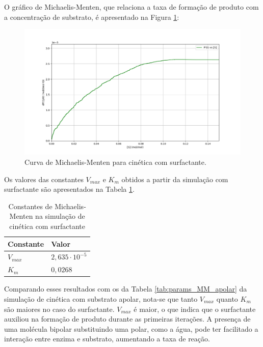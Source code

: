\documentclass[12pt,oneside]{report}
\begin{document}
O gráfico de Michaelis-Menten, que relaciona a taxa de formação de produto com a concentração de substrato, é apresentado na Figura \ref{fig:MM_surf_curve}:

\begin{figure}[H]
    \centering
    \includegraphics[width=1\textwidth]{MM_surf_curve.png}
    \caption{\small Curva de Michaelis-Menten para cinética com surfactante.}
    \label{fig:MM_surf_curve}
\end{figure}

Os valores das constantes $V_{max}$ e $K_m$ obtidos a partir da simulação com surfactante são apresentados na Tabela \ref{tab:params_MM_surfactant}.

\begin{table}[H]
    \centering
    \caption{Constantes de Michaelis-Menten na simulação de cinética com surfactante}
    \vspace{0.2cm}
    \begin{tabularx}{\textwidth}{X m{5cm}}
        \hline
        \textbf{Constante} & \textbf{Valor}          \\
        \hline
        $V_{max}$          & $2{,}635 \cdot 10^{-5}$ \\
        $K_m$              & $0{,}0268$              \\
        \hline
    \end{tabularx}
    \vspace{0.2cm}
    \label{tab:params_MM_surfactant}
\end{table}

Comparando esses resultados com os da Tabela \ref{tab:params_MM_apolar} da simulação de cinética com substrato apolar, nota-se que tanto $V_{max}$ quanto $K_m$ são maiores no caso do surfactante. $V_{max}$ é maior, o que indica que o surfactante auxiliou na formação de produto durante as primeiras iterações. A presença de uma molécula bipolar substituindo uma polar, como a água, pode ter facilitado a interação entre enzima e substrato, aumentando a taxa de reação.
\end{document}
